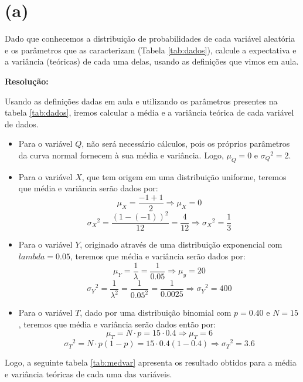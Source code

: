 \documentclass[]{abntex2}
\begin{document}
\section*{\textbf{(a)}}

\noindent Dado que conhecemos a distribuição de probabilidades de cada variável aleatória e os parâmetros que as caracterizam (Tabela \ref{tab:dados}), calcule a expectativa e a variância (teóricas) de cada uma delas, usando as definições que vimos em aula.

\textbf{Resolução:}

Usando as definições dadas em aula e utilizando os parâmetros presentes na tabela \ref{tab:dados}, iremos calcular a média e a variância teórica de cada variável de dados.

\begin{itemize}
    \item Para o variável $Q$, não será necessário cálculos, pois os próprios parâmetros da curva normal fornecem à sua média e variância. Logo, $\mu_Q = 0$ e ${{\sigma}_Q}^{2} = 2$.
    
    \item Para o variável $X$, que tem origem em uma distribuição uniforme, teremos que média e variância serão dados por:
    \[
    \mu_X = \dfrac{-1+1}{2} \Rightarrow \mu_X = 0
    \]
    \[
    {{\sigma}_X}^{2} = \dfrac{{(1-(-1))}^2}{12}=\dfrac{4}{12} \Rightarrow {{\sigma}_X}^{2} = \dfrac{1}{3}
    \]

    \item Para o variável $Y$, originado através de uma distribuição exponencial com $lambda=0.05$, teremos que média e variância serão dados por:
    \[
    \mu_Y = \dfrac{1}{\lambda} = \dfrac{1}{0.05} \Rightarrow \mu_y = 20
    \]
    \[
    {{\sigma}_Y}^{2} = \dfrac{1}{\lambda^2} = \dfrac{1}{0.05^2} = \dfrac{1}{0.0025} \Rightarrow {{\sigma}_Y}^{2} = 400
    \]

    \item Para o variável $T$, dado por uma distribuição binomial com $p=0.40$ e $N=15$, teremos que média e variância serão dados então por:
    \[
    \mu_T = N \cdot p = 15 \cdot 0.4 \Rightarrow \mu_T = 6
    \]
    \[
    {{\sigma}_T}^{2} = N\cdot p(1-p)=15 \cdot 0.4(1-0.4) \Rightarrow {{\sigma}_T}^{2} = 3.6
    \]
\end{itemize}

Logo, a seguinte tabela \ref{tab:medvar} apresenta os resultado obtidos para a média e variância teóricas de cada uma das variáveis.
\end{document}
